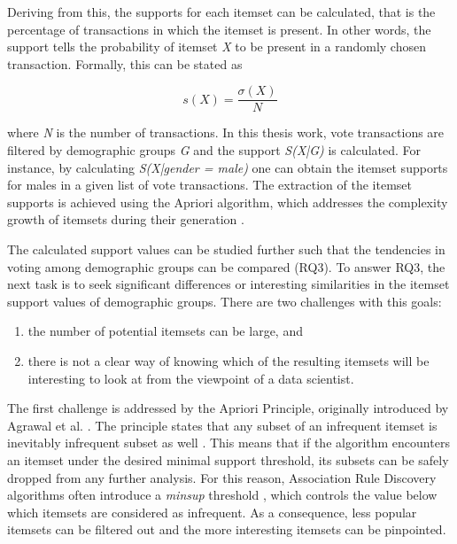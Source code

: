 Deriving from this, the supports for each itemset can be calculated, that is the percentage of transactions in which the itemset is present. In other words, the support tells the probability of itemset \emph{X} to be present in a randomly chosen transaction. Formally, this can be stated as 

\begin{equation}
    s(X) = \frac{\sigma (X)}{N}
\end{equation}

where \emph{N} is the number of transactions. In this thesis work, vote transactions are filtered by demographic groups \emph{G} and the support \emph{S(X|G)} is calculated. For instance, by calculating \emph{S(X|gender = male)} one can obtain the itemset supports for males in a given list of vote transactions. The extraction of the itemset supports is achieved using the Apriori algorithm, which addresses the complexity growth of itemsets during their generation \cite{introtodatamining}. 

The calculated support values can be studied further such that the tendencies in voting among demographic groups can be compared (RQ3). To answer RQ3, the next task is to seek significant differences or interesting similarities in the itemset support values of demographic groups. There are two challenges with this goals: 

\begin{enumerate}
    \item the number of potential itemsets can be large, and
    \item there is not a clear way of knowing which of the resulting itemsets will be interesting to look at from the viewpoint of a data scientist.
\end{enumerate} 

The first challenge is addressed by the Apriori Principle, originally introduced by Agrawal et al. \cite{agrawal1994fast}. The principle states that any subset of an infrequent itemset is inevitably infrequent subset as well \cite{agrawal1994fast, introtodatamining}. This means that if the algorithm encounters an itemset under the desired minimal support threshold, its subsets can be safely dropped from any further analysis. For this reason, Association Rule Discovery algorithms often introduce a \emph{minsup} threshold \cite{database_mining_agrawal, mining_association_rules_agrawal, introtodatamining}, which controls the value below which itemsets are considered as infrequent. As a consequence, less popular itemsets can be filtered out and the more interesting itemsets can be pinpointed. 


